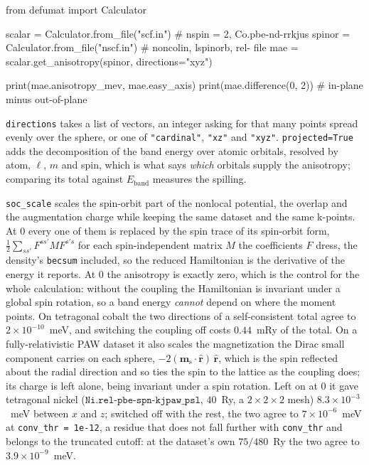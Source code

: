 \documentclass[11pt,a4paper]{article}
\newcommand{\code}[1]{\texttt{\small #1}}
\begin{document}
\begin{pycode}
from defumat import Calculator

scalar = Calculator.from_file("scf.in")          # nspin = 2, Co.pbe-nd-rrkjus
spinor = Calculator.from_file("nscf.in")         # noncolin, lspinorb, rel- file
mae = scalar.get_anisotropy(spinor, directions="xyz")

print(mae.anisotropy_mev, mae.easy_axis)
print(mae.difference(0, 2))                      # in-plane minus out-of-plane
\end{pycode}

\code{directions} takes a list of vectors, an integer asking for that many
points spread evenly over the sphere, or one of \code{"cardinal"},
\code{"xz"} and \code{"xyz"}. \code{projected=True} adds the decomposition of
the band energy over atomic orbitals, resolved by atom, $\ell$, $m$ and spin,
which is what says \emph{which} orbitals supply the anisotropy; comparing its
total against $E_{\text{band}}$ measures the spilling.

\code{soc\_scale} scales the spin-orbit part of the nonlocal potential, the
overlap and the augmentation charge while keeping the same dataset and the same
k-points. At $0$ every one of them is replaced by the spin trace of its
spin-orbit form, $\tfrac12\sum_{s s'} F^{s s'} M F^{s' s}$ for each
spin-independent matrix $M$ the coefficients $F$ dress, the density's
\code{becsum} included, so the reduced Hamiltonian is the derivative of the
energy it reports. At $0$ the anisotropy is exactly zero, which is the control
for the whole calculation: without the coupling the Hamiltonian is invariant
under a global spin rotation, so a band energy \emph{cannot} depend on where the
moment points. On tetragonal cobalt the two directions of a self-consistent
total agree to $2\times10^{-10}$~meV, and switching the coupling off costs
$0.44$~mRy of the total. On a fully-relativistic PAW dataset it also scales the
magnetization the Dirac small component carries on each sphere,
$-2(\mathbf m_{\text{s}}\cdot\hat{\mathbf r})\,\hat{\mathbf r}$, which is the
spin reflected about the radial direction and so ties the spin to the lattice as
the coupling does; its charge is left alone, being invariant under a spin
rotation. Left on at $0$ it gave tetragonal nickel
($\texttt{Ni.rel-pbe-spn-kjpaw\_psl}$, $40$~Ry, a $2\times2\times2$ mesh)
$8.3\times10^{-3}$~meV between $x$ and $z$; switched off with the rest, the two
agree to $7\times10^{-6}$~meV at \code{conv\_thr = 1e-12}, a residue that
does not fall further with \code{conv\_thr} and belongs to the truncated cutoff:
at the dataset's own $75/480$~Ry the two agree to $3.9\times10^{-9}$~meV.
\end{document}
